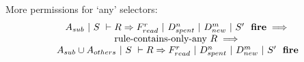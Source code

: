 \begin{theorem}
More permissions for `any' selectors:
$$
\begin{array}{c}
A_{sub}~|~S~\vdash R \Rightarrow F_{read}^r~|~D_{spent}^n~|~D_{new}^m~|~S'~~\textbf{fire}
\implies \\
\textrm{rule-contains-only-any}~R \implies \\
A_{sub} \cup A_{others}~|~S~\vdash R \Rightarrow F_{read}^r~|~D_{spent}^n~|~D_{new}^m~|~S'~~\textbf{fire}
\end{array}
$$
\end{theorem}

\eject

